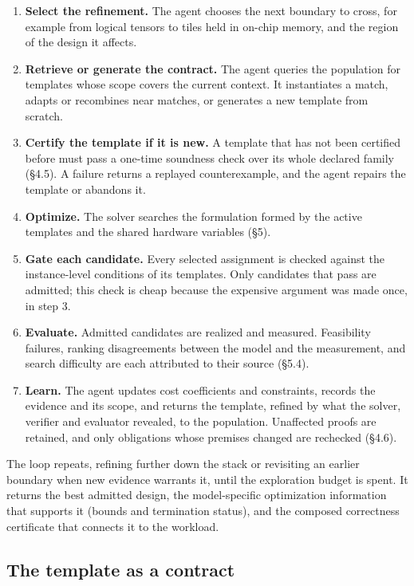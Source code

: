 \documentclass[11pt]{article}
\providecommand{\tightlist}{\setlength{\itemsep}{0pt}\setlength{\parskip}{0pt}}
\begin{document}
\begin{enumerate}
\def\labelenumi{\arabic{enumi}.}
\tightlist
\item
  \textbf{Select the refinement.} The agent chooses the next boundary to cross, for example from logical tensors to tiles held in on-chip memory, and the region of the design it affects.
\item
  \textbf{Retrieve or generate the contract.} The agent queries the population for templates whose scope covers the current context. It instantiates a match, adapts or recombines near matches, or generates a new template from scratch.
\item
  \textbf{Certify the template if it is new.} A template that has not been certified before must pass a one-time soundness check over its whole declared family (§4.5). A failure returns a replayed counterexample, and the agent repairs the template or abandons it.
\item
  \textbf{Optimize.} The solver searches the formulation formed by the active templates and the shared hardware variables (§5).
\item
  \textbf{Gate each candidate.} Every selected assignment is checked against the instance-level conditions of its templates. Only candidates that pass are admitted; this check is cheap because the expensive argument was made once, in step 3.
\item
  \textbf{Evaluate.} Admitted candidates are realized and measured. Feasibility failures, ranking disagreements between the model and the measurement, and search difficulty are each attributed to their source (§5.4).
\item
  \textbf{Learn.} The agent updates cost coefficients and constraints, records the evidence and its scope, and returns the template, refined by what the solver, verifier and evaluator revealed, to the population. Unaffected proofs are retained, and only obligations whose premises changed are rechecked (§4.6).
\end{enumerate}

The loop repeats, refining further down the stack or revisiting an earlier boundary when new evidence warrants it, until the exploration budget is spent. It returns the best admitted design, the model-specific optimization information that supports it (bounds and termination status), and the composed correctness certificate that connects it to the workload.

\hypertarget{the-template-as-a-contract}{%
\subsection{The template as a contract}\label{the-template-as-a-contract}}
\end{document}
